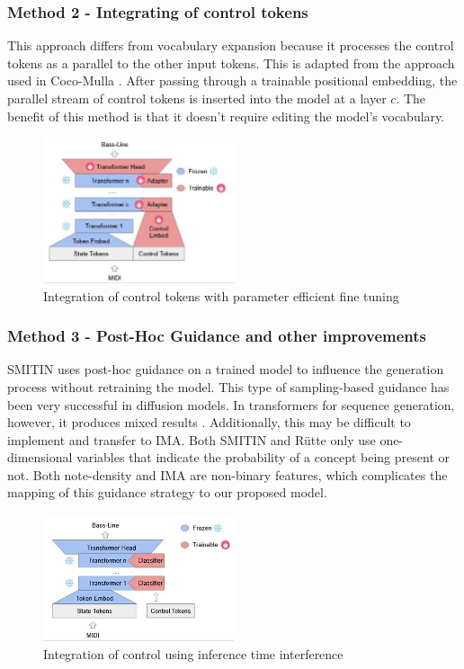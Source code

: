\subsubsection{Method 2 - Integrating of control tokens} 

This approach differs from vocabulary expansion because it processes the control tokens as a parallel to the other input tokens. This is adapted from the approach used in Coco-Mulla \cite{Lin_cocomulla_2024}. After passing through a trainable positional embedding, the parallel stream of control tokens is inserted into the model at a layer $c$. The benefit of this method is that it doesn't require editing the model's vocabulary. 

\begin{figure}[H]
\centering
\includegraphics[width=0.5\textwidth]{IMAGES/ControlTokensLora.jpg} 
\caption{Integration of control tokens with parameter efficient fine tuning}
\label{fig:controltok}
\end{figure}

\subsubsection{Method 3 - Post-Hoc Guidance and other improvements}

SMITIN\cite{Koo_Wichern_Germain_SMITIN_2024} uses post-hoc guidance on a trained model to influence the generation process without retraining the model. This type of sampling-based guidance has been very successful in diffusion models. In transformers for sequence generation, however, it produces mixed results \cite{language_guide_rutte_2024}. Additionally, this may be difficult to implement and transfer to IMA. Both SMITIN and Rütte\cite{language_guide_rutte_2024} only use one-dimensional variables that indicate the probability of a concept being present or not. Both note-density and IMA are non-binary features, which complicates the mapping of this guidance strategy to our proposed model. 

\begin{figure}[H]
\centering
\includegraphics[width=0.5\textwidth]{IMAGES/adhoccontrol.jpg} 
\caption{Integration of control using inference time interference}
\label{fig:adhoccontrol}
\end{figure}

